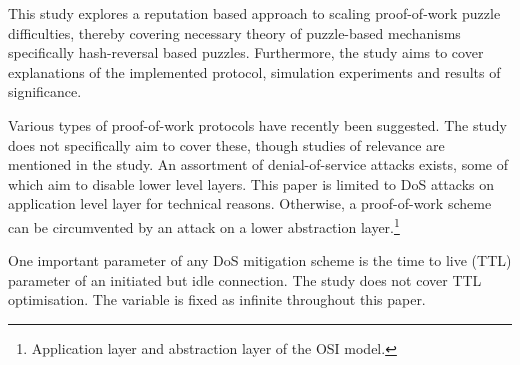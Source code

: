 This study explores a reputation based approach to scaling proof-of-work puzzle difficulties, thereby covering necessary theory of puzzle-based mechanisms specifically hash-reversal based puzzles. Furthermore, the study aims to cover explanations of the implemented protocol, simulation experiments and results of significance. 

Various types of proof-of-work protocols have recently been suggested. The study does not specifically aim to cover these, though studies of relevance are mentioned in the study. An assortment of denial-of-service attacks exists, some of which aim to disable lower level layers. This paper is limited to DoS attacks on application level layer for technical reasons. Otherwise, a proof-of-work scheme can be circumvented by an attack on a lower abstraction layer.\footnote{Application layer and abstraction layer of the OSI model.}

One important parameter of any DoS mitigation scheme is the time to live (TTL) parameter of an initiated but idle connection. The study does not cover TTL optimisation. The variable is fixed as infinite throughout this paper.
\begin{comment}


Scope: \\
The coverage of this study ..... \\
The study consists of ..... \\
The study covers the ..... \\
This study is focus on ..... \\

Delimitations: \\
The study does not cover the ..... \\
The researcher limited this research to ..... \\
This study is limited to .....


\end{comment}